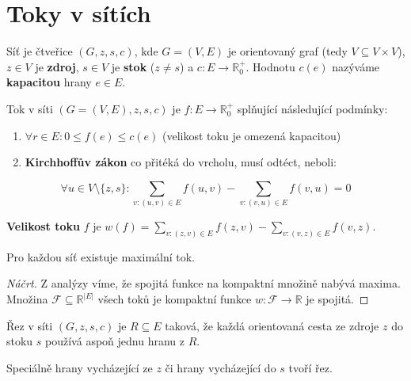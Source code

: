 \chapter{Toky v sítích}

\begin{definice}
	Síť je čtveřice $(G, z, s, c)$, kde $G = (V, E)$ je orientovaný graf (tedy $V \subseteq V \times V$), $z \in V$ je \textbf{zdroj}, $s \in V$ je \textbf{stok} ($z \neq s$) a $c: E \to \mathbb{R}_{0}^{+}$. Hodnotu $c(e)$ nazýváme \textbf{kapacitou} hrany $e \in E$.
\end{definice}

\begin{definice}
	Tok v síti $(G = (V, E), z, s, c)$ je $f: E \to \mathbb{R}_{0}^{+}$ splňující následující podmínky:
	
	\begin{enumerate}
		\item $\forall r \in E : 0 \leq f(e) \leq c(e)$ (velikost toku je omezená kapacitou)
		\item \textbf{Kirchhoffův zákon} co přitéká do vrcholu, musí odtéct, neboli:
	\end{enumerate}
	
	$$
	\forall u \in V \setminus \{ z, s\}: \sum_{v:(u,v) \in E} f(u,v) - \sum_{v:(v, u) \in E} f(v,u) = 0
	$$
\end{definice}

\begin{definice}
	\textbf{Velikost toku} $f$ je $w(f) = \sum_{v:(z,v) \in E} f(z,v) - \sum_{v:(v, z) \in E} f(v,z)$.
\end{definice}

\begin{tvrz}
	Pro každou síť existuje maximální tok.
\end{tvrz}

\begin{proof}[Náčrt]
	Z analýzy víme, že spojitá funkce na kompaktní množině nabývá maxima. Množina $\mathcal{F} \subseteq \mathbb{R}^{|E|}$ všech toků je kompaktní funkce $w: \mathcal{F} \to \mathbb{R}$ je spojitá.
\end{proof}

\begin{definice}
	Řez v síti $(G, z, s, c)$ je $R \subseteq E$ taková, že každá orientovaná cesta ze zdroje $z$ do stoku $s$ používá aspoň jednu hranu z $R$.
\end{definice}

Speciálně hrany vycházející ze $z$ či hrany vycházející do $s$ tvoří řez.

